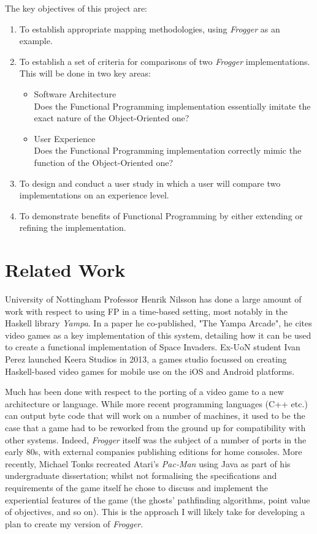 \documentclass[12pt, a4paper]{report}
\begin{document}
The key objectives of this project are:
\begin{enumerate}
  \item To establish appropriate mapping methodologies, using \textit{Frogger} as an example.
  \item To establish a set of criteria for comparisons of two \textit{Frogger} implementations.\\
        This will be done in two key areas:
    \begin{itemize}
      \item Software Architecture\\
        Does the Functional Programming implementation essentially imitate the exact nature of the Object-Oriented one?
      \item User Experience\\
        Does the Functional Programming implementation correctly mimic the function of the Object-Oriented one?
    \end{itemize}
  \item To design and conduct a user study in which a user will compare two implementations on an experience level.
  \item To demonstrate benefits of Functional Programming by either extending or refining the implementation.
\end{enumerate}

\section{Related Work}
University of Nottingham Professor Henrik Nilsson has done a large amount of work with respect to using FP in a time-based setting, most notably in the Haskell library \textit{Yampa}.
In a paper he co-published, "The Yampa Arcade"\cite{yampaarcade}, he cites video games as a key implementation of this system, detailing how it can be used to create a functional implementation of Space Invaders.
Ex-UoN student Ivan Perez launched Keera Studios in 2013, a games studio focussed on creating Haskell-based video games for mobile use on the iOS and Android platforms.

\par

Much has been done with respect to the porting of a video game to a new architecture or language.
While more recent programming languages (C++ etc.) can output byte code that will work on a number of machines, it used to be the case that a game had to be reworked from the ground up for compatibility with other systems.
Indeed, \textit{Frogger} itself was the subject of a number of ports in the early 80s, with external companies publishing editions for home consoles.
More recently, Michael Tonks recreated Atari's \textit{Pac-Man} using Java as part of his undergraduate dissertation; whilst not formalising the specifications and requirements of the game itself he chose to discuss and implement the experiential features of the game (the ghosts' pathfinding algorithms, point value of objectives, and so on)\cite{michaeltonks}.
This is the approach I will likely take for developing a plan to create my version of \textit{Frogger}.
\end{document}
